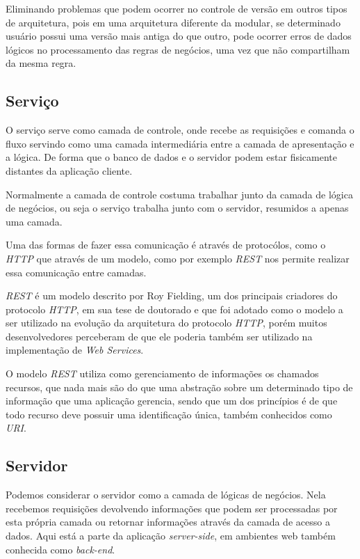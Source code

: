 \documentclass[
	12pt,				%
	openright,			%
	twoside,			%
	a4paper,			%
	english,			%
	brazil				%
	]{abntex2}
\begin{document}
Eliminando problemas que podem ocorrer no controle de versão em outros tipos de arquitetura, pois em uma arquitetura diferente da modular, se determinado usuário possui uma versão mais antiga do que outro, pode ocorrer erros de dados lógicos no processamento das regras de negócios, uma vez que não compartilham da mesma regra.

\subsection{Serviço}
\label{subsec:Servico}

O serviço serve como camada de controle, onde recebe as requisições e comanda o fluxo servindo como uma camada intermediária entre a camada de apresentação e a lógica. De forma que o banco de dados e o servidor podem estar fisicamente distantes da aplicação cliente.

Normalmente a camada de controle costuma trabalhar junto da camada de lógica de negócios, ou seja o serviço trabalha junto com o servidor, resumidos a apenas uma camada.

Uma das formas de fazer essa comunicação é através de protocólos, como o \textit{HTTP} que através de um modelo, como por exemplo \textit{REST} nos permite realizar essa comunicação entre camadas.

\textit{REST} é um modelo descrito por Roy Fielding, um dos principais criadores do protocolo \textit{HTTP}, em sua tese de doutorado e que foi adotado como o modelo a ser utilizado na evolução da arquitetura do protocolo \textit{HTTP}, porém muitos desenvolvedores perceberam de que ele poderia também ser utilizado na implementação de \textit{Web Services}.

O modelo \textit{REST} utiliza como gerenciamento de informações os chamados recursos, que nada mais são do que uma abstração sobre um determinado tipo de informação que uma aplicação gerencia, sendo que um dos princípios é de que todo recurso deve possuir uma identificação única, também conhecidos como \textit{URI}.

\subsection{Servidor}
\label{subsec:Servidor}

Podemos considerar o servidor como a camada de lógicas de negócios. Nela recebemos requisições devolvendo informações que podem ser processadas por esta própria camada ou retornar informações através da camada de acesso a dados. Aqui está a parte da aplicação \textit{server-side}, em ambientes web também conhecida como \textit{back-end}.
\end{document}
